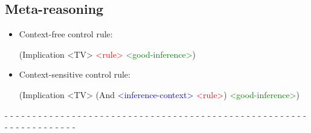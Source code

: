 \documentclass[aspectratio=169]{beamer}
\begin{document}
\subsection{Meta-reasoning}




\begin{frame}[fragile]

  \begin{itemize}
\item Context-free control rule:

\begin{semiverbatim}
  (Implication <TV>
    \textcolor{red}{<rule>}
    \textcolor{green}{<good-inference>})
\end{semiverbatim}

\item Context-sensitive control rule:
\begin{semiverbatim}
  (Implication <TV>
    (And
      \textcolor{blue}{<inference-context>}
      \textcolor{red}{<rule>})
    \textcolor{green}{<good-inference>})
\end{semiverbatim}



  \end{itemize}


  - - - - - - - - - - - - - - - - - - - - - - - - - - - - - - - - - -
  - - - - - - - - - - - - - - - - - - - - - - - - - - - - - - - - -\\[0.1cm]

\end{frame}
\end{document}
